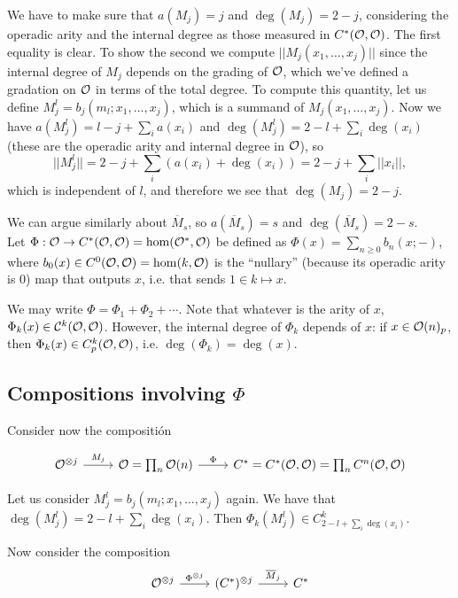 \documentclass[twoside]{article}
\begin{document}
We have to make sure that $a(M_j)=j$ and $\deg(M_j)=2-j$, considering the operadic arity and the internal degree as those measured in $C^*({\mathcal O},{\mathcal O})$. The first equality is clear. To show the second we compute $||M_j(x_1,\dots, x_j)||$ since the internal degree of $M_j$ depends on the grading of ${\mathcal O}$, which we've defined a gradation on ${\mathcal O}$ in terms of the total degree. To compute this quantity, let us define $M_j^l=b_j(m_l;x_1,\dots, x_j)$, which is a summand of $M_j(x_1,\dots, x_j)$. Now we have $a(M_j^l)=l-j+\sum_i a(x_i)$ and $\deg(M_j^l)=2-l+\sum_i \deg(x_i)$ (these are the operadic arity and internal degree in ${\mathcal O}$), so $$||M_j^l||=2-j+\sum_i(a(x_i)+\deg(x_i))=2-j+\sum_i||x_i||,$$ which is independent of $l$, and therefore we see that $\deg(M_j)=2-j$.

We can argue similarly about $\overline{M}_s$, so $a(\overline{M}_s)=s$ and $\deg(\overline{M}_s)=2-s$.\\

Let $\Phi:{\mathcal O}\to C^*({\mathcal O},{\mathcal O})=\hom({\mathcal O}^*,{\mathcal O})$ be defined as $\Phi(x)=\sum_{n\geq 0}b_n(x;-)$, where $b_0(x)\in C^0({\mathcal O},{\mathcal O})=\hom(k,{\mathcal O})$ is the ``nullary'' (because its operadic arity is 0) map that outputs $x$, i.e. that sends $1\in k\mapsto x$.  

We may write $\Phi=\Phi_1+\Phi_2+\cdots$. Note that whatever is the arity of $x$, $\Phi_k(x)\in{\mathcal C}^k({\mathcal O},{\mathcal O})$. However, the internal degree of $\Phi_k$ depends of $x$: if $x\in{\mathcal O}(n)_p$, then $\Phi_k(x)\in C^k_p({\mathcal O},{\mathcal O})$, i.e. $\deg(\Phi_k)=\deg(x)$. 

\subsection{Compositions involving $\Phi$}

Consider now the compositión 

\[
\begin{tikzcd}
\OO^{\otimes j}\arrow[r, "M_j"] & \OO=\prod_n\OO(n)\arrow[r,"\Phi"] &C^*=C^*(\OO,\OO)=\prod_n C^n(\OO,\OO)
\end{tikzcd}
\]

Let us consider $M_j^l=b_j(m_l;x_1,\dots, x_j)$ again. We have that %
$\deg(M_j^l)=2-l+\sum_i \deg(x_i)$. Then $\Phi_k(M_j^l)\in C^k_{2-l+\sum_i \deg(x_i)}$.

Now consider the composition
\[
\begin{tikzcd}
\OO^{\otimes j}\arrow[r,"\Phi^{\otimes j}"] &(C^*)^{\otimes j}\arrow[r, "\overline{M}_j"] & C^*
\end{tikzcd}
\]
\end{document}
